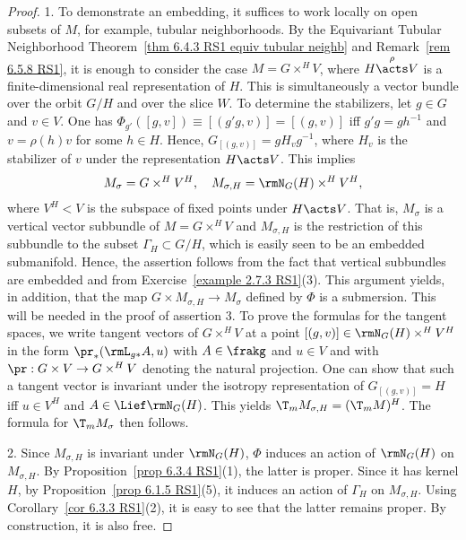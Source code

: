 \begin{proof}
    1. To demonstrate an embedding, it suffices to work locally on open subsets of $M$, for example, tubular neighborhoods. By the Equivariant Tubular Neighborhood Theorem~\ref{thm 6.4.3 RS1 equiv tubular neighb} and Remark~\ref{rem 6.5.8 RS1}, it is enough to consider the case $M=G\times^H V$, where $H\overset{\rho}{\acts} V$ is a finite-dimensional real representation of $H$. This is simultaneously a vector bundle over the orbit $G\slash H$ and over the slice $W$. To determine the stabilizers, let $g\in G$ and $v\in V$. One has $\Phi_{g'}\left([g,v]\right)\equiv [(g'g,v)]=[(g,v)]$ iff $g'g=gh^{-1}$ and $v=\rho(h)v$ for some $h\in H$. 
    Hence,  $G_{[(g,v)]}=gH_v g^{-1}$, where $H_v$ is the stabilizer of $v$ under the representation $H\acts V$. This implies 
    \[M_\sigma=G\times^H V^H,\quad M_{\sigma, H}=\rmN_G(H)\times^H V^H,\]
    where $V^H< V$ is the subspace of fixed points under $H\acts V$. That is, $M_\sigma$ is a vertical vector subbundle of $M=G\times^H V$ and $M_{\sigma,H}$ is the restriction of this subbundle to the subset $\varGamma_H\subset G\slash H$, which is easily seen to be an embedded submanifold. Hence, the assertion follows from the fact that vertical subbundles are embedded and from Exercise~\ref{example 2.7.3 RS1}(3). This argument yields, in addition, that the map $G\times M_{\sigma, H}\to M_\sigma$ defined by $\Phi$ is a submersion. This will be needed in the proof of assertion 3. To prove the formulas for the tangent spaces, we write tangent vectors of $G\times^H V$ at a point $[(g,v)]\in \rmN_G(H)\times^H V^H$ in the form $\pr_\ast(\rmL_{g\ast}A,u)$ with $A\in\frakg$ and $u\in V$ and with $\pr:G\times V\to G\times^H V$ denoting the natural projection. One can show that such a tangent vector is invariant under the isotropy representation of $G_{[(g,v)]}=H$ iff $u\in V^H$ and $A\in \Lief\rmN_G(H)$. This yields $\T_m M_{\sigma,H}=(\T_m M)^H$. The formula for $\T_m M_\sigma$ then follows.

    2. Since $M_{\sigma,H}$ is invariant under $\rmN_G(H)$, $\Phi$ induces an action of $\rmN_G(H)$ on $M_{\sigma,H}$. By Proposition~\ref{prop 6.3.4 RS1}(1), the latter is proper. Since it has kernel $H$, by Proposition~\ref{prop 6.1.5 RS1}(5), it induces an action of $\varGamma_H$ on $M_{\sigma, H}$. Using Corollary~\ref{cor 6.3.3 RS1}(2), it is easy to see that the latter remains proper. By construction, it is also free.


\end{proof}
